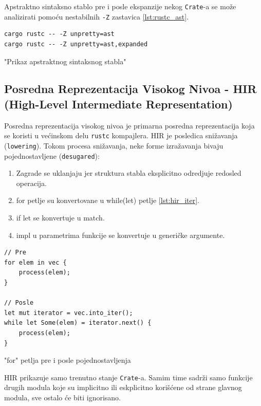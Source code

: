 \documentclass[11pt]{article}
\begin{document}
Apstraktno sintaksno stablo pre i posle ekspanzije nekog \verb|Crate|-a se može analizirati pomoću 
nestabilnih \verb|-Z| zastavica \ref{lst:rustc_ast}.


\begin{listing}[H]
\begin{verbatim}
cargo rustc -- -Z unpretty=ast
cargo rustc -- -Z unpretty=ast,expanded
\end{verbatim}
\caption{"Prikaz apstraktnog sintaksnog stabla"}
\label{lst:rustc_ast}
\end{listing}

\newpage
\subsection{Posredna Reprezentacija Visokog Nivoa - HIR (High-Level Intermediate Representation)}


Posredna reprezentacija visokog nivoa je primarna posredna reprezentacija koja se koristi 
u većinskom delu \verb|rustc| kompajlera. HIR je posledica snižavanja (\verb|lowering|). 
Tokom procesa snižavanja, neke forme izražavanja bivaju pojednostavljene (\verb|desugared|):
\begin{enumerate}
    \item Zagrade se uklanjaju jer struktura stabla eksplicitno odredjuje redosled operacija.
    \item for petlje su konvertovane u while(let) petlje \ref{lst:hir_iter}.
    \item if let se konvertuje u match.
    \item impl u parametrima funkcije se konvertuje u generičke argumente.
\end{enumerate}

\begin{listing}[H]
\begin{verbatim}
// Pre
for elem in vec {
    process(elem);
}

// Posle
let mut iterator = vec.into_iter();
while let Some(elem) = iterator.next() {
    process(elem);
}
\end{verbatim}
\caption{"for" petlja pre i posle pojednostavljenja}
\label{lst:hir_iter}
\end{listing}

HIR prikazuje samo trenutno stanje \verb|Crate|-a.
Samim time sadrži samo funkcije drugih modula koje su implicitno ili eskplicitno korišćene 
od strane glavnog modula, sve ostalo će biti ignorisano.
\end{document}
